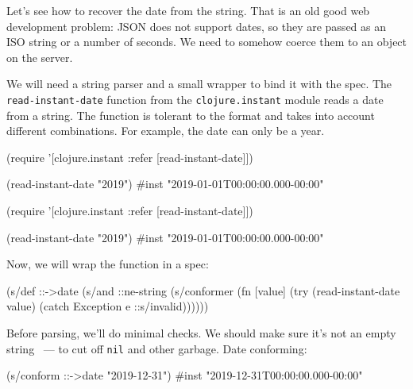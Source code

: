 
Let's see how to recover the date from the string. That is an old good web development problem: JSON does not support dates, so they are passed as an ISO string or a number of seconds. We need to somehow coerce them to an object on the server.


We will need a string parser and a small wrapper to bind it with the spec. The \verb|read-instant-date| function from the \verb|clojure.instant| module reads a date from a string. The function is tolerant to the format and takes into account different combinations. For example, the date can only be a year.


\ifx\DEVICETYPE\MOBILE

\begin{english}
  \begin{clojure}
(require '[clojure.instant
           :refer [read-instant-date]])

(read-instant-date "2019")
#inst "2019-01-01T00:00:00.000-00:00"
  \end{clojure}
\end{english}

\else

\begin{english}
  \begin{clojure}
(require '[clojure.instant :refer [read-instant-date]])

(read-instant-date "2019")
#inst "2019-01-01T00:00:00.000-00:00"
  \end{clojure}
\end{english}

\fi

Now, we will wrap the function in a spec:

\begin{english}
  \begin{clojure}
(s/def ::->date
  (s/and
   ::ne-string
   (s/conformer
    (fn [value]
      (try
        (read-instant-date value)
        (catch Exception e
          ::s/invalid))))))
  \end{clojure}
\end{english}

Before parsing, we'll do minimal checks. We should make sure it's not an empty string ~--- to cut off \verb|nil| and other garbage. Date conforming:

\begin{english}
  \begin{clojure}
(s/conform ::->date "2019-12-31")
#inst "2019-12-31T00:00:00.000-00:00"
  \end{clojure}
\end{english}

